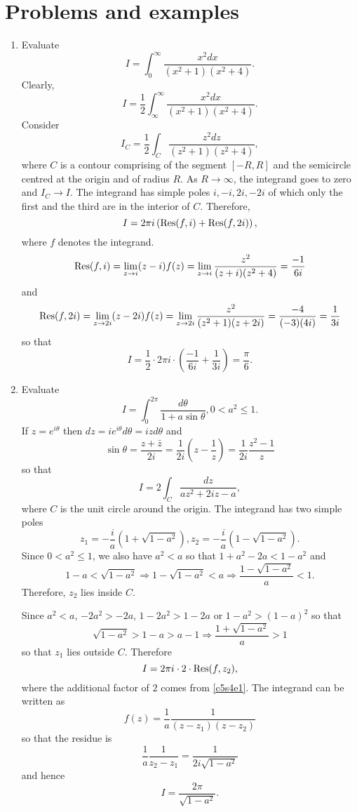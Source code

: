 \section{Problems and examples}\label{c5s4}
\begin{enumerate}
\item Evaluate \cite{dk}
\[
I = \int_0^\infty \frac{x^2dx}{(x^2 + 1)(x^2 + 4)}.
\]
Clearly,
\[
I = \frac{1}{2}\int_{\infty}^\infty \frac{x^2dx}{(x^2 + 1)(x^2 + 4)}.
\]
Consider
\[
I_C = \frac{1}{2}\int_C \frac{z^2dz}{(z^2 + 1)(z^2 + 4)},
\]
where $C$ is a contour comprising of the segment $[-R, R]$ and the semicircle centred
at the origin and of radius $R$. As $R \rightarrow \infty$, the integrand goes to
zero and $I_C \rightarrow I$. The integrand has simple poles $i, -i, 2i, -2i$ of which
only the first and the third are in the interior of $C$. Therefore,
\[
I = 2\pi i\left(\operatorname{Res}(f, i) + \operatorname{Res}(f, 2i)\right),
\]
where $f$ denotes the integrand. 
\[
\operatorname{Res}(f, i) = \lim_{z \rightarrow i}(z - i)f(z) = 
\lim_{z \rightarrow i}\frac{z^2}{(z+i)(z^2+4)} = \frac{-1}{6i}
\]
and
\[
\operatorname{Res}(f, 2i) = \lim_{z \rightarrow 2i}(z - 2i)f(z) = 
\lim_{z \rightarrow 2i}\frac{z^2}{(z^2+1)(z+2i)} = \frac{-4}{(-3)(4i)} = \frac{1}{3i}
\]
so that
\[
I = \frac{1}{2}\cdot 2\pi i \cdot \left(\frac{-1}{6i} + \frac{1}{3i}\right) = \frac{\pi}{6}.
\]

\item Evaluate \cite{dk}
\[
I = \int_0^{2\pi}\frac{d\theta}{1 + a\sin\theta}, 0 < a^2 \le 1.
\]
If $z = e^{i\theta}$ then $dz = ie^{i\theta}d\theta = izd\theta$ and
\[
\sin\theta = \frac{z + \bar{z}}{2i} = \frac{1}{2i}\left(z - \frac{1}{z}\right) =
\frac{1}{2i}\frac{z^2 - 1}{z}
\]
so that
\begin{equation}\label{c5s4e1}
I = 2\int_C \frac{dz}{az^2+2iz-a},
\end{equation}
where $C$ is the unit circle around the origin. The integrand has two simple poles
\[
z_1 = -\frac{i}{a}(1 + \sqrt{1 - a^2}), z_2 = -\frac{i}{a}(1 - \sqrt{1 - a^2}).
\]
Since $0 < a^2 \le 1$, we also have $a^2 < a$ so that $1 + a^2 - 2a < 1 - a^2$ and
\[
1 - a < \sqrt{1 - a^2} \Rightarrow 1 - \sqrt{1 - a^2} < a \Rightarrow
\frac{1 - \sqrt{1 - a^2}}{a} < 1.
\]
Therefore, $z_2$ lies inside $C$.

Since $a^2 < a$, $-2a^2 > -2a$, $1 - 2a^2 > 1 - 2a$ or $1 - a^2 > (1 - a)^2$ so that
\[
\sqrt{1 - a^2} > 1 - a > a - 1 \Rightarrow \frac{ 1 + \sqrt{1 - a^2}}{a} > 1
\]
so that $z_1$ lies outside $C$. Therefore
\[
I = 2\pi i \cdot 2 \cdot \operatorname{Res}(f, z_2),
\]
where the additional factor of $2$ comes from \eqref{c5s4e1}. The integrand can be 
written as 
\[
f(z) = \frac{1}{a}\frac{1}{(z-z_1)(z-z_2)}
\]
so that the residue is
\[
\frac{1}{a}\frac{1}{z_2 - z_1} = \frac{1}{2i\sqrt{1-a^2}}
\]
and hence
\[
I = \frac{2\pi}{\sqrt{1 - a^2}}.
\]


\end{enumerate}

